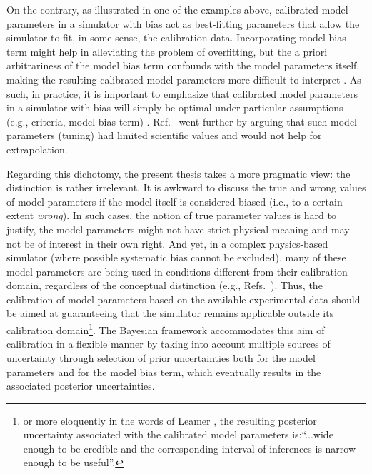 On the contrary, as illustrated in one of the examples above, calibrated model parameters in a simulator with bias act as best-fitting parameters that allow the simulator to fit, in some sense, the calibration data.
Incorporating model bias term might help in alleviating the problem of overfitting, but the a priori arbitrariness of the model bias term confounds with the model parameters itself, making the resulting calibrated model parameters more difficult to interpret \cite{Higdon2004}.
As such, in practice, it is important to emphasize that calibrated model parameters in a simulator with bias will simply be optimal under particular assumptions (e.g., criteria, model bias term) \cite{Campbell2006}.
Ref.~\cite{Brynjarsdottir2014} went further by arguing that such model parameters (tuning) had limited scientific values and would not help for extrapolation.

Regarding this dichotomy, the present thesis takes a more pragmatic view: the distinction is rather irrelevant.
It is awkward to discuss the true and wrong values of model parameters if the model itself is considered biased (i.e., to a certain extent \emph{wrong}).
In such cases, the notion of true parameter values is hard to justify, the model parameters might not have strict physical meaning and may not be of interest in their own right.
And yet, in a complex physics-based simulator (where possible systematic bias cannot be excluded), many of these model parameters are being used in conditions different from their calibration domain, regardless of the conceptual distinction (e.g., Refs.~\cite{Arendt2012,USNRC2012}).
Thus, the calibration of model parameters based on the available experimental data should be aimed at guaranteeing that the simulator remains applicable outside its calibration domain\footnote{or more eloquently in the words of Leamer \cite{Saltelli2006}, the resulting posterior uncertainty associated with the calibrated model parameters is:``...wide enough to be credible and the corresponding interval of inferences is narrow enough to be useful''.}.
The Bayesian framework accommodates this aim of calibration in a flexible manner by taking into account multiple sources of uncertainty through selection of prior uncertainties both for the model parameters and for the model bias term, which eventually results in the associated posterior uncertainties.

